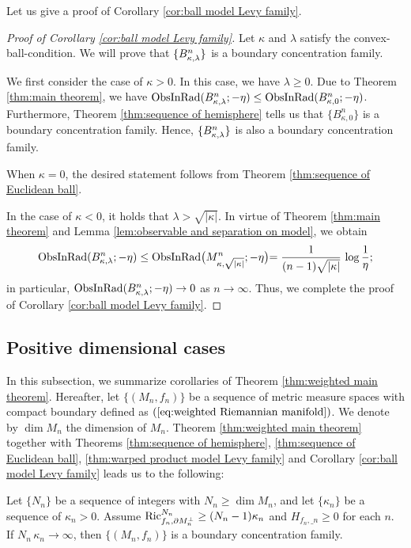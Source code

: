 Let us give a proof of Corollary \ref{cor:ball model Levy family}.
\begin{proof}[Proof of Corollary \ref{cor:ball model Levy family}]
Let $\kappa$ and $\lambda$ satisfy the convex-ball-condition.
We will prove that
$\{B^{n}_{\kappa,\lambda}\}$ is a boundary concentration family.

We first consider the case of $\kappa>0$.
In this case,
we have $\lambda \geq 0$.
Due to Theorem \ref{thm:main theorem},
we have $\operatorname{ObsInRad}(B^{n}_{\kappa,\lambda};-\eta) \leq \operatorname{ObsInRad}(B^{n}_{\kappa,0};-\eta)$.
Furthermore,
Theorem \ref{thm:sequence of hemisphere} tells us that
$\{B^{n}_{\kappa,0}\}$ is a boundary concentration family.
Hence,
$\{B^{n}_{\kappa,\lambda}\}$ is also a boundary concentration family.

When $\kappa=0$,
the desired statement follows from Theorem \ref{thm:sequence of Euclidean ball}.

In the case of $\kappa<0$,
it holds that $\lambda>\sqrt{\vert \kappa \vert}$.
In virtue of Theorem \ref{thm:main theorem} and Lemma \ref{lem:observable and separation on model},
we obtain
\begin{equation*}
\operatorname{ObsInRad}(B^{n}_{\kappa,\lambda};-\eta) \leq \operatorname{ObsInRad}\bigl(M^{n}_{\kappa,\sqrt{ \vert \kappa \vert}};-\eta\bigl) = \frac{1}{(n-1)\sqrt{ \vert \kappa \vert}}\,\log \frac{1}{\eta};
\end{equation*}
in particular,
$\operatorname{ObsInRad}(B^{n}_{\kappa,\lambda};-\eta)\to 0$ as $n\to \infty$.
Thus,
we complete the proof of Corollary \ref{cor:ball model Levy family}.
\end{proof}

\subsection{Positive dimensional cases}\label{sec:Positive dimensional cases}
In this subsection,
we summarize corollaries of Theorem \ref{thm:weighted main theorem}.
Hereafter,
let $\{(M_{n},f_{n})\}$ be a sequence of metric measure spaces with compact boundary defined as $(\ref{eq:weighted Riemannian manifold})$.
We denote by $\dim M_{n}$ the dimension of $M_{n}$.
Theorem \ref{thm:weighted main theorem} together with Theorems \ref{thm:sequence of hemisphere}, \ref{thm:sequence of Euclidean ball}, \ref{thm:warped product model Levy family} and Corollary \ref{cor:ball model Levy family} leads us to the following:
\begin{cor}\label{cor:hemisphere corollary}
Let $\{N_{n}\}$ be a sequence of integers with $N_{n} \geq \dim M_{n}$,
and let $\{\kappa_{n}\}$ be a sequence of $\kappa_{n}>0$.
Assume $\operatorname{Ric}^{N_{n}}_{f_{n},\partial M_{n}^{\perp}}\geq (N_{n}-1)\kappa_{n}$ and $H_{f_{n},\bm_{n}}\geq 0$ for each $n$.
If $N_{n}\,\kappa_{n}\to \infty$,
then $\{(M_{n},f_{n})\}$ is a boundary concentration family.
\end{cor}

